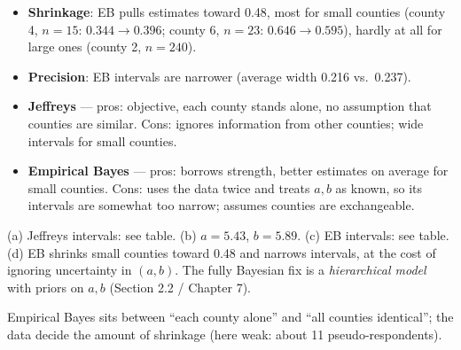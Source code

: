 \documentclass[11pt]{article}
\begin{document}
\begin{itemize}
\item \textbf{Shrinkage}: EB pulls estimates toward 0.48, most for small counties (county 4, $n=15$: $0.344\to0.396$; county 6, $n=23$: $0.646\to0.595$), hardly at all for large ones (county 2, $n=240$).
\item \textbf{Precision}: EB intervals are narrower (average width 0.216 vs.\ 0.237).
\item \textbf{Jeffreys} --- pros: objective, each county stands alone, no assumption that counties are similar. Cons: ignores information from other counties; wide intervals for small counties.
\item \textbf{Empirical Bayes} --- pros: borrows strength, better estimates on average for small counties. Cons: uses the data twice and treats $a,b$ as known, so its intervals are somewhat too narrow; assumes counties are exchangeable.
\end{itemize}

\begin{answer}
(a) Jeffreys intervals: see table. \quad (b) $a=5.43$, $b=5.89$. \quad (c) EB intervals: see table.\\
(d) EB shrinks small counties toward 0.48 and narrows intervals, at the cost of ignoring uncertainty in $(a,b)$. The fully Bayesian fix is a \emph{hierarchical model} with priors on $a,b$ (Section 2.2 / Chapter 7).
\end{answer}

\begin{takeaway}
Empirical Bayes sits between ``each county alone'' and ``all counties identical''; the data decide the amount of shrinkage (here weak: about 11 pseudo-respondents).
\end{takeaway}
\end{document}
